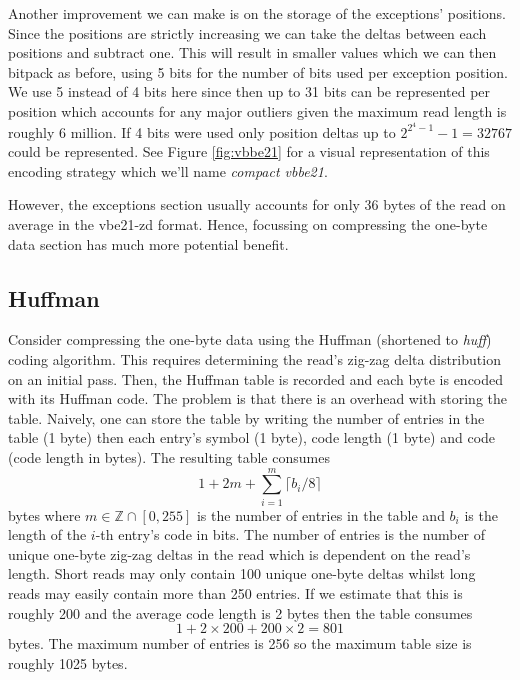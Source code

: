 Another improvement we can make is on the storage of the exceptions' positions.
Since the positions are strictly increasing we can take the deltas between each
positions and subtract one. This will result in smaller values which we can then
bitpack as before, using 5 bits for the number of bits used per exception
position. We use 5 instead of 4 bits here since then up to 31 bits can be
represented per position which accounts for any major outliers given the maximum
read length is roughly 6 million. If 4 bits were used only position deltas up to
$2^{2^{4}-1}-1=32767$ could be represented.
See Figure \ref{fig:vbbe21} for a visual representation of this encoding
strategy which we'll name \textit{compact vbbe21}.




However, the exceptions section usually accounts for only 36 bytes of the read
on average in the vbe21-zd format. Hence, focussing on compressing the one-byte
data section has much more potential benefit.

\subsection{Huffman}

Consider compressing the one-byte data using the Huffman (shortened to
\textit{huff}) coding algorithm. This requires determining the read's zig-zag
delta distribution on an initial pass. Then, the Huffman table is recorded and
each byte is encoded with its Huffman code. The problem is that there is an
overhead with storing the table.  Naively, one can store the table by writing
the number of entries in the table (1 byte) then each entry's symbol (1 byte),
code length (1 byte) and code (code length in bytes). The resulting table
consumes
\[ 1 + 2m + \sum_{i=1}^m\lceil b_i / 8 \rceil \]
bytes where $m\in\mathbb{Z}\cap[0,255]$ is the number of entries in the table
and $b_i$ is the length of the $i$-th entry's code in bits. The number of
entries is the number of unique one-byte zig-zag deltas in the read which is
dependent on the read's length. Short reads may only contain 100 unique one-byte
deltas whilst long reads may easily contain more than 250 entries. If we
estimate that this is roughly 200 and the average code length is 2 bytes then
the table consumes
\[ 1 + 2\times 200 + 200\times 2 = 801 \]
bytes. The maximum number of entries is 256 so the maximum table size is roughly
1025 bytes.

